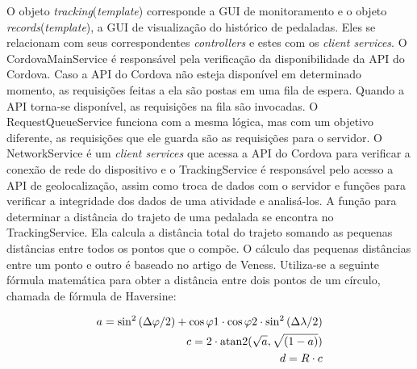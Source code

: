 O objeto \textit{tracking}(\textit{template}) corresponde a GUI de monitoramento e o objeto \textit{records}(\textit{template}), a GUI de visualização do histórico de pedaladas. Eles se relacionam com seus correspondentes \textit{controllers} e estes com os \textit{client services}. O CordovaMainService é responsável pela verificação da disponibilidade da API do Cordova. Caso a API do Cordova não esteja disponível em determinado momento, as requisições feitas a ela são postas em uma fila de espera. Quando a API torna-se disponível, as requisições na fila são invocadas. O RequestQueueService funciona com a mesma lógica, mas com um objetivo diferente, as requisições que ele guarda são as requisições para o servidor. O NetworkService é um \textit{client services} que acessa a API do Cordova para verificar a conexão de rede do dispositivo e o TrackingService é responsável pelo acesso a API de geolocalização, assim como troca de dados com o servidor e funções para verificar a integridade dos dados de uma atividade e analisá-los. A função para determinar a distância do trajeto de uma pedalada se encontra no TrackingService. Ela calcula a distância total do trajeto somando as pequenas distâncias entre todos os pontos que o compõe. O cálculo das pequenas distâncias entre um ponto e outro é baseado no artigo de Veness\citeyearpar{veness2015Distance}. Utiliza-se a seguinte fórmula matemática para obter a distância entre dois pontos de um círculo, chamada de fórmula de Haversine:

\begin{equation}
\begin{split}
a=\sin ^{2}\left( \Delta \varphi  / 2\right) + \cos \varphi 1\cdot \cos \varphi 2\cdot \sin ^{2}\left( \Delta \lambda  / 2\right) 
\\
c=2\cdot{\rm atan2}(\sqrt {a},\sqrt {\left( 1-a\right) })
\\
d=R \cdot c
\end{split}
\label{eqt:calcDistance}
\end{equation}

